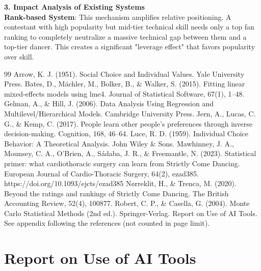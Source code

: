 \documentclass[12pt]{article}
\begin{document}
	\noindent \textbf{3. Impact Analysis of Existing Systems} \\
	\textbf{Rank-based System}: This mechanism amplifies relative positioning. A contestant with high popularity but mid-tier technical skill needs only a top fan ranking to completely neutralize a massive technical gap between them and a top-tier dancer. This creates a significant "leverage effect" that favors popularity over skill.
	
	\clearpage
	
	\begin{thebibliography}{99}
		 Arrow, K. J. (1951). Social Choice and Individual Values. Yale University Press.
		 Bates, D., Mächler, M., Bolker, B., \& Walker, S. (2015). Fitting linear mixed-effects models using lme4. Journal of Statistical Software, 67(1), 1–48. 
		 Gelman, A., \& Hill, J. (2006). Data Analysis Using Regression and Multilevel/Hierarchical Models. Cambridge University Press.
		 Jern, A., Lucas, C. G., \& Kemp, C. (2017). People learn other people’s preferences through inverse decision-making. Cognition, 168, 46–64. 
		 Luce, R. D. (1959). Individual Choice Behavior: A Theoretical Analysis. John Wiley \& Sons.
		 Mawhinney, J. A., Mounsey, C. A., O'Brien, A., Sádaba, J. R., \& Freemantle, N. (2023). Statistical primer: what cardiothoracic surgery can learn from Strictly Come Dancing. European Journal of Cardio-Thoracic Surgery, 64(2), ezad385. https://doi.org/10.1093/ejcts/ezad385
		 Nørreklit, H., \& Trenca, M. (2020). Beyond the ratings and rankings of Strictly Come Dancing. The British Accounting Review, 52(4), 100877.
		 Robert, C. P., \& Casella, G. (2004). Monte Carlo Statistical Methods (2nd ed.). Springer-Verlag.
		 Report on Use of AI Tools. See appendix following the references (not counted in page limit).
	\end{thebibliography}
	\label{LastPage}
	
	\clearpage
	\pagestyle{empty}
	
	\section*{Report on Use of AI Tools}
	\vspace{0.5em}
	
\end{document}
